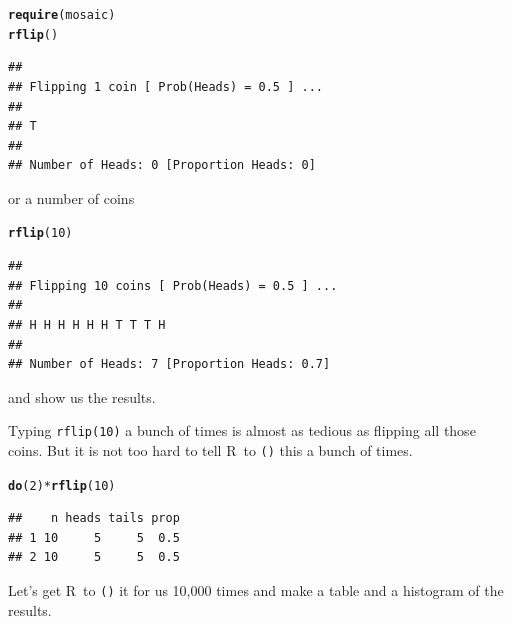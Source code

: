 \documentclass[twoside]{book}
\makeatletter
\newcommand{\hlnum}[1]{\textcolor[rgb]{0.686,0.059,0.569}{#1}}%
\newcommand{\hlopt}[1]{\textcolor[rgb]{0,0,0}{#1}}%
\newcommand{\hlstd}[1]{\textcolor[rgb]{0.345,0.345,0.345}{#1}}%
\newcommand{\hlkwd}[1]{\textcolor[rgb]{0.737,0.353,0.396}{\textbf{#1}}}%
\newenvironment{kframe}{%
 \def\at@end@of@kframe{}%
 \ifinner\ifhmode%
  \def\at@end@of@kframe{\end{minipage}}%
  \begin{minipage}{\columnwidth}%
 \fi\fi%
 \def\FrameCommand##1{\hskip\@totalleftmargin \hskip-\fboxsep
 \colorbox{shadecolor}{##1}\hskip-\fboxsep
     \hskip-\linewidth \hskip-\@totalleftmargin \hskip\columnwidth}%
 \MakeFramed {\advance\hsize-\width
   \@totalleftmargin\z@ \linewidth\hsize
   \@setminipage}}%
 {\par\unskip\endMakeFramed%
 \at@end@of@kframe}
\newenvironment{knitrout}{}{} %
\newcommand{\Rindex}[1]{\index{\texttt{#1}}}
\newcommand{\function}[1]{{\color{purple!75!blue}\texttt{\StrSubstitute{#1}{()}{}()}}\Rindex{#1}}
\renewcommand{\code}[1]{{\color{blue!80!black}\texttt{#1}}}
\def\R{{\sf R}}
\makeatother
\begin{document}
\begin{knitrout}
\color{fgcolor}\begin{kframe}
\begin{alltt}
\hlkwd{require}\hlstd{(mosaic)}
\hlkwd{rflip}\hlstd{()}
\end{alltt}
\begin{verbatim}
## 
## Flipping 1 coin [ Prob(Heads) = 0.5 ] ...
## 
## T
## 
## Number of Heads: 0 [Proportion Heads: 0]
\end{verbatim}
\end{kframe}
\end{knitrout}
or a number of coins
\begin{knitrout}
\color{fgcolor}\begin{kframe}
\begin{alltt}
\hlkwd{rflip}\hlstd{(}\hlnum{10}\hlstd{)}
\end{alltt}
\begin{verbatim}
## 
## Flipping 10 coins [ Prob(Heads) = 0.5 ] ...
## 
## H H H H H H T T T H
## 
## Number of Heads: 7 [Proportion Heads: 0.7]
\end{verbatim}
\end{kframe}
\end{knitrout}
and show us the results.

Typing \code{rflip(10)} a bunch of times is almost as tedious as 
flipping all those coins.   But it is not too hard to 
tell \R\ to \function{do()} this a bunch of times.
\begin{knitrout}
\color{fgcolor}\begin{kframe}
\begin{alltt}
\hlkwd{do}\hlstd{(}\hlnum{2}\hlstd{)} \hlopt{*} \hlkwd{rflip}\hlstd{(}\hlnum{10}\hlstd{)}
\end{alltt}
\begin{verbatim}
##    n heads tails prop
## 1 10     5     5  0.5
## 2 10     5     5  0.5
\end{verbatim}
\end{kframe}
\end{knitrout}
Let's get \R\ to \function{do()} it for us 10,000 times and make 
a table and a histogram of the results.
\end{document}
